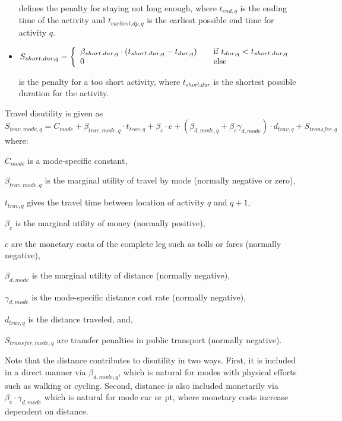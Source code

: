 \begin{itemize}
defines the penalty for staying not long enough, where $t_{end,q}$ is the ending time of the activity and $t_{earliest.dp,q}$ is the earliest possible end time for activity $q$.

\item $ S_{short.dur, q} = \left\{
  \begin{array}{l l}
    \beta_{short.dur,q} \cdot (t_{short.dur, q} - t_{dur,q}) & \quad \text{if $t_{dur,q} < t_{short.dur,q}$}\\
    0 & \quad \text{else}
  \end{array} \right.$
  
  is the penalty for a too short activity, where $t_{short.dur}$ is the shortest possible duration for the activity.
\end{itemize}
%
Travel disutility is given as 
\begin{equation}
\label{eq:tdisutility}
S_{trav, mode, q} = C_{mode} + \beta_{trav, mode, q} \cdot t_{trav, q} + \beta_{c} \cdot c  + (\beta_{d, mode, q} + \beta_{c} \gamma_{d, mode}) \cdot d_{trav,q} + S_{transfer,q} \,
\end{equation} 
where:
\begin{compactitem} 
\item $C_{mode}$ is a mode-specific constant,
\item $\beta_{trav, mode, q}$ is the marginal utility of travel by mode (normally negative or zero),
\item $t_{trav, q}$ gives the travel time between location of activity $q$ and $q+1$,
\item $\beta_{c}$ is the marginal utility of money (normally positive),
\item $c$ are the monetary costs of the complete leg such as tolls or fares (normally negative),
\item $\beta_{d, mode}$ is the  marginal utility of distance (normally negative),
\item $\gamma_{d, mode}$ is the mode-specific distance cost rate (normally negative),
\item $d_{trav, q}$ is the distance traveled, and,
\item $S_{transfer, mode, q}$ are transfer penalties in public transport (normally negative).
\end{compactitem}
%
Note that the distance contributes to disutility in two ways. First, it is included in a direct manner via $\beta_{d, mode,q}$, which is natural for modes with physical efforts such as walking or cycling. Second, distance is also included monetarily via $\beta_c \cdot \gamma_{d, mode}$ which is natural for mode car or pt, where monetary costs increase dependent on distance.

